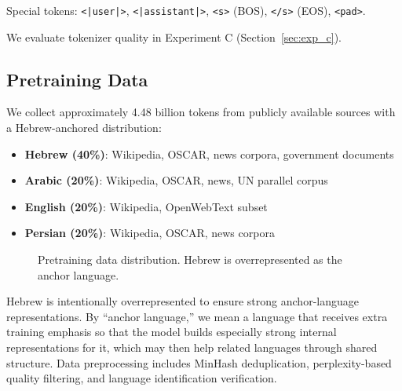 \documentclass[10pt,twocolumn]{article}
\begin{document}
Special tokens: \texttt{<|user|>}, \texttt{<|assistant|>}, \texttt{<s>} (BOS), \texttt{</s>} (EOS), \texttt{<pad>}.

We evaluate tokenizer quality in Experiment C (Section~\ref{sec:exp_c}).

\subsection{Pretraining Data}

We collect approximately 4.48 billion tokens from publicly available sources with a Hebrew-anchored distribution:

\begin{itemize}
    \item \textbf{Hebrew (40\%)}: Wikipedia, OSCAR, news corpora, government documents
    \item \textbf{Arabic (20\%)}: Wikipedia, OSCAR, news, UN parallel corpus
    \item \textbf{English (20\%)}: Wikipedia, OpenWebText subset
    \item \textbf{Persian (20\%)}: Wikipedia, OSCAR, news corpora
\end{itemize}

\begin{figure}[H]
\centering
{}
\caption{Pretraining data distribution. Hebrew is overrepresented as the anchor language.}
\label{fig:data_dist}
\end{figure}

Hebrew is intentionally overrepresented to ensure strong anchor-language representations. By ``anchor language,'' we mean a language that receives extra training emphasis so that the model builds especially strong internal representations for it, which may then help related languages through shared structure. Data preprocessing includes MinHash deduplication, perplexity-based quality filtering, and language identification verification.
\end{document}
